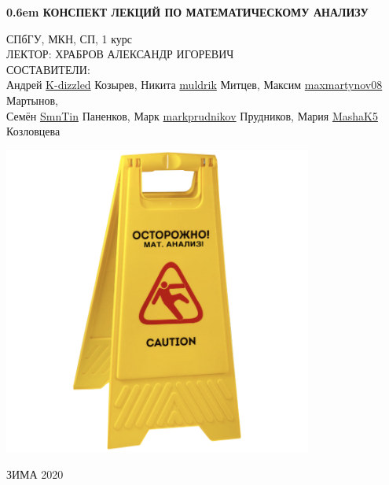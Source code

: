 \documentclass[12pt,letterpaper]{report}
\theoremstyle{definition}
\begin{document}
\clearpage
\newcommand\nbvspace[1][3]{\vspace*{\stretch{#1}}}
\newcommand\nbstretchyspace{\spaceskip0.5em plus 0.25em minus 0.25em}
\newcommand{\nbtitlestretch}{\spaceskip0.6em}
\pagestyle{empty}
\begin{center}
\bfseries
\nbvspace[1]
\Huge
{\nbtitlestretch\huge
КОНСПЕКТ ЛЕКЦИЙ ПО МАТЕМАТИЧЕСКОМУ АНАЛИЗУ}

\nbvspace[1]
\normalsize

СПбГУ, МКН, СП, 1 курс\\
ЛЕКТОР: ХРАБРОВ АЛЕКСАНДР ИГОРЕВИЧ
\nbvspace[1]
\\
\Large СОСТАВИТЕЛИ:\\[0.5em]
\footnotesize 
Андрей \href{https://github.com/K-dizzled}{K-dizzled} Козырев, 
Никита  \href{https://github.com/muldrik}{muldrik} Митцев,
Максим \href{https://github.com/maxmartynov08}{maxmartynov08} Мартынов,\\ 
Семён \href{https://github.com/SmnTin}{SmnTin} Паненков,
Марк \href{https://github.com/markprudnikov}{markprudnikov} Прудников,
Мария \href{https://github.com/MashaK5}{MashaK5} Козловцева

\nbvspace[2]

\includegraphics[width=4.0in]{./images/Danger_Matan.png}
\nbvspace[3]
\normalsize

\large
ЗИМА 2020
\nbvspace[1]
\end{center}
\newpage
\pagestyle{plain}
\fi
\end{document}
